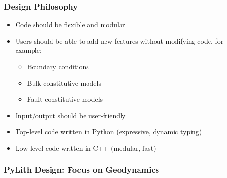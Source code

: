 \documentclass{beamer}
\begin{document}
\begin{frame}
  \frametitle{Design Philosophy}

  \begin{itemize}
  \item Code should be flexible and modular
  \item Users should be able to add new features without modifying
    code, for example:
    \begin{itemize}
    \item Boundary conditions
    \item Bulk constitutive models
    \item Fault constitutive models
    \end{itemize}
  \item Input/output should be user-friendly
  \item Top-level code written in Python (expressive, dynamic typing)
  \item Low-level code written in C++ (modular, fast)
  \end{itemize}

\end{frame}


\begin{frame}
  \frametitle{PyLith Design: Focus on Geodynamics}

  

\end{frame}
\end{document}
